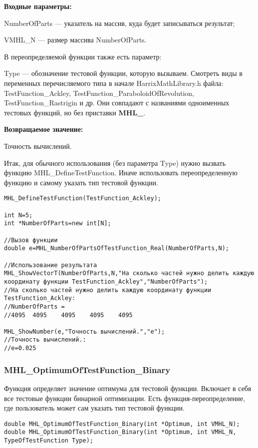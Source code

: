 \documentclass[a4paper,12pt]{article}
\begin{document}
\textbf{Входные параметры:}

NumberOfParts --- указатель на массив, куда будет записываться результат;

VMHL\_N --- размер массива NumberOfParts.

В переопределяемой функции также есть параметр:
  
Type --- обозначение тестовой функции, которую вызываем.
Смотреть виды в переменных перечисляемого типа в начале HarrixMathLibrary.h файла: TestFunction\_Ackley, TestFunction\_ParaboloidOfRevolution, TestFunction\_Rastrigin и др. Они совпадают с названиями одноименных тестовых функций, но без приставки \textbf{MHL\_}.

\textbf{Возвращаемое значение:}
 
Точность вычислений.

Итак, для обычного использования (без параметра Type) нужно вызвать функцию MHL\_DefineTestFunction. Иначе использовать переопределенную функцию и самому указать тип тестовой функции.


\begin{lstlisting}[label=code_use_MHL_NumberOfPartsOfTestFunction_Real,caption=Пример использования]
MHL_DefineTestFunction(TestFunction_Ackley);

int N=5;
int *NumberOfParts=new int[N];

//Вызов функции
double e=MHL_NumberOfPartsOfTestFunction_Real(NumberOfParts,N);

//Использование результата
MHL_ShowVectorT(NumberOfParts,N,"На сколько частей нужно делить каждую координату функции TestFunction_Ackley","NumberOfParts");
//На сколько частей нужно делить каждую координату функции TestFunction_Ackley:
//NumberOfParts =	
//4095	4095	4095	4095	4095

MHL_ShowNumber(e,"Точность вычислений.","e");
//Точность вычислений.:
//e=0.025
\end{lstlisting}

\subsubsection{MHL\_OptimumOfTestFunction\_Binary}\label{MHL_OptimumOfTestFunction_Binary}

Функция определяет значение оптимума для тестовой функции. Включает в себя все тестовые функции бинарной оптимизации. Есть функция-переопределение, где пользователь может сам указать тип тестовой функции.


\begin{lstlisting}[label=code_syntax_MHL_OptimumOfTestFunction_Binary,caption=Синтаксис]
double MHL_OptimumOfTestFunction_Binary(int *Optimum, int VMHL_N);
double MHL_OptimumOfTestFunction_Binary(int *Optimum, int VMHL_N, TypeOfTestFunction Type);
\end{lstlisting}
\end{document}
